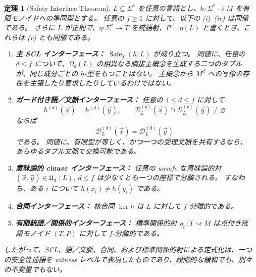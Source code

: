\documentclass[10pt,a4paper]{ltjsarticle}
\newtheorem{theorem}{定理}[section]
\theoremstyle{definition}
\theoremstyle{remark}
\newcommand{\D}{\mathcal D}
\newcommand{\Om}{\Omega}
\newcommand{\relto}{\mathrel{\rightsquigarrow}}
\begin{document}
\begin{theorem}[Safety Interface Theorem]
\label{alg:thm:safety-interface}
$L\subseteq\Sigma^*$ を任意の言語とし、$h:\Sigma^*\to M$ を有限モノイドへの準同型とする。
任意の $f\ge1$ に対して、以下の \textup{(i)}--\textup{(iv)} は同値である。
さらに $L$ が正則で、$\eta:\Sigma^*\twoheadrightarrow T$ を統語射、$P=\eta(L)$ と書くとき、これらは \textup{(v)} とも同値である。
\begin{enumerate}[label=(\roman*),leftmargin=*]
\item \textbf{主 SCL インターフェース：}
$\operatorname{Safe}_f(h;L)$ が成り立つ。
同値に、任意の $d\le f$ について、$\Om_d(L)$ の相異なる隣接主概念を生成する二つのタプルが、同じ成分ごとの $h$-型をもつことはない。
主概念から $M^d$ への写像の存在を主張したり要求したりしているわけではない。

\item \textbf{ガード付き語／文脈インターフェース：}
任意の $1\le d\le f$ に対して
\[
h^{(d)}(\vec x)=h^{(d)}(\vec y),
\qquad
\D_L^{(d)}(\vec x)\cap\D_L^{(d)}(\vec y)\ne\varnothing
\]
ならば
\[
\D_L^{(d)}(\vec x)=\D_L^{(d)}(\vec y)
\]
である。
同値に、有限型が等しく、かつ一つの受理文脈を共有するなら、あらゆるタプル文脈で交換可能である。

\item \textbf{意味論的 clause インターフェース：}
任意の unsafe な意味論的対
$(\vec x,\vec y)\in\mathfrak U_d(L)$, $d\le f$
は少なくとも一つの座標で分離される。
すなわち、ある $i$ について
$h(x_i)\ne h(y_i)$
である。

\item \textbf{合同インターフェース：}
核合同 $\ker h$ は $L$ に対して $f$-分離的である。

\item \textbf{有限統語／関係的インターフェース：}
標準関係的射 $\rho_h:T\relto M$ は点付き統語モノイド $(T,P)$ に対して $f$-分離的である。
\end{enumerate}
したがって、SCL、語／文脈、合同、および標準関係的射による定式化は、一つの安全性述語を witness レベルで表現したものであり、段階的な緩和でも、別々の不変量でもない。
\end{theorem}
\end{document}
